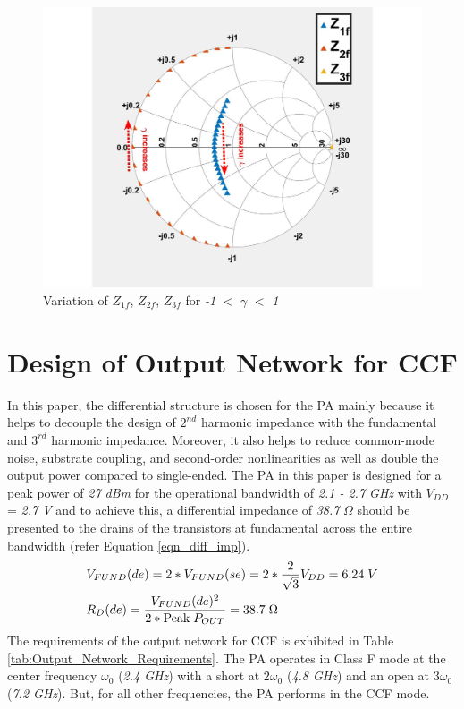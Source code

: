 \documentclass[conference]{IEEEtran}
\begin{document}
\begin{figure}[!t]
\centering
\captionsetup{font=footnotesize}
\includegraphics[width=0.8\linewidth]{Images/CCF/CCF_SC.jpg}
\caption{Variation of $Z_{1f}$, $Z_{2f}$, $Z_{3f}$ for \textit{-1} $<$ $\gamma$ $<$ \textit{1}}
\label{fig:CCF_SC}
\vspace{-0.05in}
\end{figure}
 

\section{Design of Output Network for CCF}
\label{section:ON}
In this paper, the differential structure is chosen for the PA mainly because it helps to decouple the design of $2^{nd}$ harmonic impedance with the fundamental and $3^{rd}$ harmonic impedance. Moreover, it also helps to reduce common-mode noise, substrate coupling, and second-order nonlinearities as well as double the output power compared to single-ended. 
The PA in this paper is designed for a peak power of \textit{27 dBm} for the operational bandwidth of \textit{2.1 - 2.7 GHz} with $V_{DD}$ = \textit{2.7 V} and to achieve this, a differential impedance of \textit{38.7} $\Omega$ should be presented to the drains of the transistors at fundamental across the entire bandwidth (refer Equation \ref{eqn_diff_imp}). 
\vspace{-0.1in}
\begin{equation}
\begin{aligned}
&V_{FUND}(de)=2*V_{FUND}(se)=2*\frac{2}{\sqrt{3}} V_{DD}=6.24 \hspace{1mm}V\\
&R_{D}(de)=\frac{V_{FUND}(de)^{2}}{2*\text{Peak} \hspace{1mm} P_{OUT}}=38.7 \hspace{1mm} \Omega
\label{eqn_diff_imp}
\end{aligned}
\end{equation}
The requirements of the output network for CCF is exhibited in Table \ref{tab:Output_Network_Requirements}. The PA operates in Class F mode at the center frequency $\omega_0$ (\textit{2.4 GHz}) with a short at $2\omega_0$ (\textit{4.8 GHz}) and an open at $3\omega_0$ (\textit{7.2 GHz}). But, for all other frequencies, the PA performs in the CCF mode. 
\end{document}
